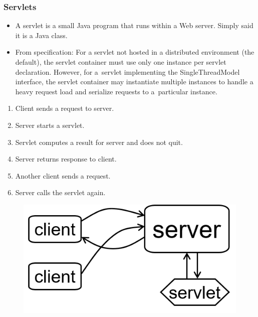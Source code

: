 \documentclass[10pt,xcolor=pdflatex]{beamer}
\begin{document}
\begin{frame}\frametitle{Servlets}
  \begin{itemize}
    \item A servlet is a small Java program that runs within a Web server. Simply said it is a Java class.
    \item From specification: For a servlet not hosted in a distributed environment (the default), the servlet container must use only one instance per servlet declaration. However, for a~servlet implementing the SingleThreadModel interface, the servlet container may instantiate multiple instances to handle a heavy request load and serialize requests to a~particular instance.\newline
  \end{itemize}
  \begin{minipage}{0.6\textwidth}
  \begin{enumerate}
   	\item Client sends a request to server.
    \item Server starts a servlet.
	\item Servlet computes a result for server and does not quit.
	\item Server returns response to client.
	\item Another client sends a request.
	\item Server calls the servlet again.
  \end{enumerate} \hfill
    \end{minipage}
	\begin{minipage}{0.3\textwidth}
    \begin{figure}[H]
    \includegraphics[scale=0.55]{img/obr2}
    \end{figure}
    \end{minipage} \hfill    
{}
\end{frame}
\end{document}
